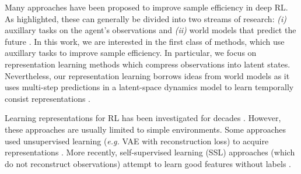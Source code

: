 \documentclass{article}
\makeatletter
\theoremstyle{plain}
\theoremstyle{definition}
\theoremstyle{remark}
\newcommand{\eg}{\textit{e.g.\@}\xspace}
\makeatother
\begin{document}
Many approaches have been proposed to improve sample efficiency in deep RL.
As \citet{laskinCURLContrastiveUnsupervised2020} highlighted, these can generally be divided into two streams of research:
{\em (i)} auxillary tasks on the agent's observations and {\em (ii)} world models that predict the future
\citep{haRecurrentWorldModels2018,hafnerLearning2019,hansenTemporalDifferenceLearning2022}.
In this work, we are interested in the first class of methods, which use auxillary tasks to improve sample efficiency.
In particular, we focus on representation learning methods which compress observations into latent states.
Nevertheless, our representation learning borrows ideas from world models as it uses multi-step predictions in a
latent-space dynamics model to learn temporally consist representations \citep{zhaoSimplifiedTemporalConsistency2023}.

Learning representations for RL has been investigated for decades
\citep{abelOptimalBehaviorApproximate2016,mannorDynamicAbstractionReinforcement2004,liUnifiedTheoryState2006,andreStateAbstractionProgrammable2002,deardenAbstractionApproximateDecisiontheoretic1997,singhReinforcementLearningSoft1994,higginsDefinitionDisentangledRepresentations2018,vanhoofStableReinforcementLearning2016,watterEmbedControlLocally2015,ghoshRepresentationsStableOffPolicy2020}.
However, these approaches are usually limited to simple environments.
Some approaches used unsupervised learning (\eg VAE \citep{kingmaAutoEncoding2014} with reconstruction loss) to acquire representations
\citep{finnDeepSpatialAutoencoders2016,higginsDARLAImprovingZeroShot2017,langeAutonomousReinforcementLearning2012,watterEmbedControlLocally2015}.
More recently, self-supervised learning (SSL) approaches (which do not reconstruct observations)
attempt to learn good features without labels \cite{anandUnsupervisedStateRepresentation2019}.
\end{document}
